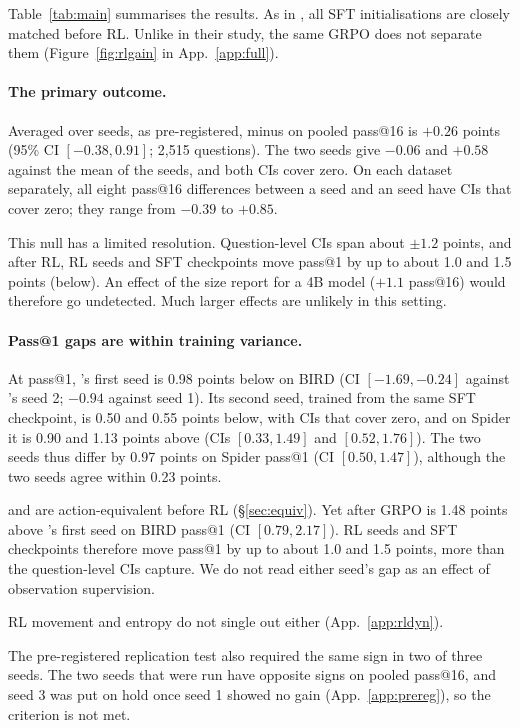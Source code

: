 Table~\ref{tab:main} summarises the results. As in \citet{zhang2026actobs}, all SFT initialisations are closely matched before RL. Unlike in their study, the same GRPO does not separate them (Figure~\ref{fig:rlgain} in App.~\ref{app:full}).

\paragraph{The primary outcome.}
Averaged over seeds, as pre-registered, \armB{} minus \armA{} on pooled pass@16 is $+0.26$ points (95\% CI $[-0.38, 0.91]$; 2,515 questions). The two \armB{} seeds give $-0.06$ and $+0.58$ against the mean of the \armA{} seeds, and both CIs cover zero. On each dataset separately, all eight pass@16 differences between a \armB{} seed and an \armA{} seed have CIs that cover zero; they range from $-0.39$ to $+0.85$.

This null has a limited resolution. Question-level CIs span about $\pm1.2$ points, and after RL, RL seeds and SFT checkpoints move pass@1 by up to about 1.0 and 1.5 points (below). An effect of the size \citet{zhang2026actobs} report for a 4B model ($+1.1$ pass@16) would therefore go undetected. Much larger effects are unlikely in this setting.

\paragraph{Pass@1 gaps are within training variance.}
At pass@1, \armB's first seed is 0.98 points below \armA{} on BIRD (CI $[-1.69,-0.24]$ against \armA's seed 2; $-0.94$ against seed 1). Its second seed, trained from the same SFT checkpoint, is 0.50 and 0.55 points below, with CIs that cover zero, and on Spider it is 0.90 and 1.13 points above \armA{} (CIs $[0.33, 1.49]$ and $[0.52, 1.76]$). The two \armB{} seeds thus differ by 0.97 points on Spider pass@1 (CI $[0.50, 1.47]$), although the two \armA{} seeds agree within 0.23 points.

\armC{} and \armB{} are action-equivalent before RL (\S\ref{sec:equiv}). Yet after GRPO \armC{} is 1.48 points above \armB's first seed on BIRD pass@1 (CI $[0.79, 2.17]$). RL seeds and SFT checkpoints therefore move pass@1 by up to about 1.0 and 1.5 points, more than the question-level CIs capture. We do not read either seed's gap as an effect of observation supervision.

RL movement and entropy do not single out \armB{} either (App.~\ref{app:rldyn}).

The pre-registered replication test also required the same sign in two of three seeds. The two seeds that were run have opposite signs on pooled pass@16, and seed 3 was put on hold once seed 1 showed no gain (App.~\ref{app:prereg}), so the criterion is not met.